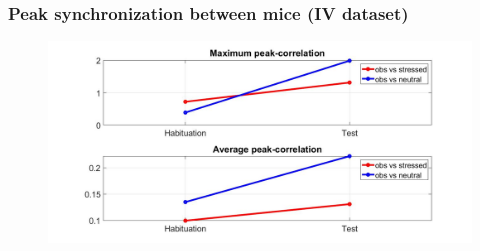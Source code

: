 \documentclass{beamer}
\begin{document}
\begin{frame}
\frametitle{Peak synchronization between mice (IV dataset)}


\begin{figure}[H]
	\begin{center}
		\hspace*{-1.3cm}
		\includegraphics[scale=.30]{peak_synch4.jpg} 
	\end{center}  
	
	
\end{figure}

\end{frame}
\end{document}
